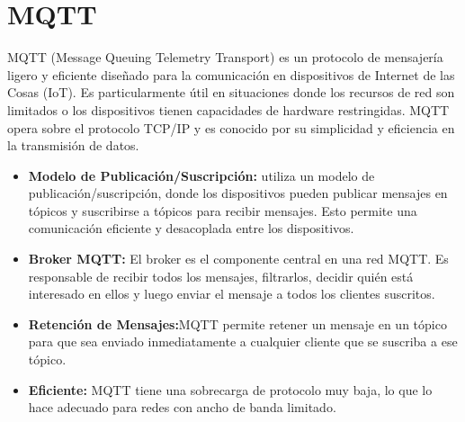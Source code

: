 \section{MQTT}
MQTT (Message Queuing Telemetry Transport) \cite{gutierrez2011aplicacion} es un protocolo de mensajería ligero y eficiente diseñado para la comunicación en dispositivos de Internet de las Cosas (IoT). Es particularmente útil en situaciones donde los recursos de red son limitados o los dispositivos tienen capacidades de hardware restringidas. MQTT opera sobre el protocolo TCP/IP y es conocido por su simplicidad y eficiencia en la transmisión de datos.
\begin{itemize}
    \item \textbf{Modelo de Publicación/Suscripción:} utiliza un modelo de publicación/suscripción, donde los dispositivos pueden publicar mensajes en tópicos y suscribirse a tópicos para recibir mensajes. Esto permite una comunicación eficiente y desacoplada entre los dispositivos.
    \item \textbf{Broker MQTT:} El broker es el componente central en una red MQTT. Es responsable de recibir todos los mensajes, filtrarlos, decidir quién está interesado en ellos y luego enviar el mensaje a todos los clientes suscritos.
    \item \textbf{Retención de Mensajes:}MQTT permite retener un mensaje en un tópico para que sea enviado inmediatamente a cualquier cliente que se suscriba a ese tópico.
    \item \textbf{Eficiente:}  MQTT tiene una sobrecarga de protocolo muy baja, lo que lo hace adecuado para redes con ancho de banda limitado.
\end{itemize}

